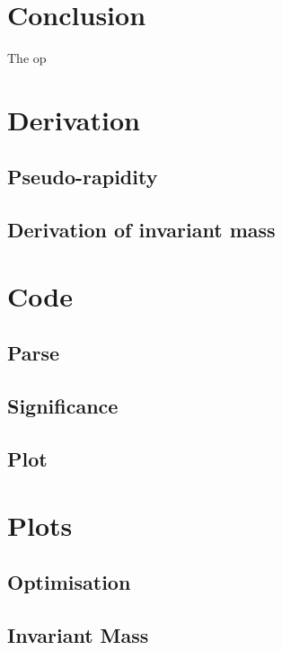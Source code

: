 \documentclass{article}
\begin{document}
\section{Conclusion}
The op


\appendix
\section{Derivation}
\subsection{Pseudo-rapidity}
\subsection{Derivation of invariant mass}
\section{Code}
\subsection{Parse}
\subsection{Significance}
\subsection{Plot}
\section{Plots}
\subsection{Optimisation}
\subsection{Invariant Mass}
\end{document}
